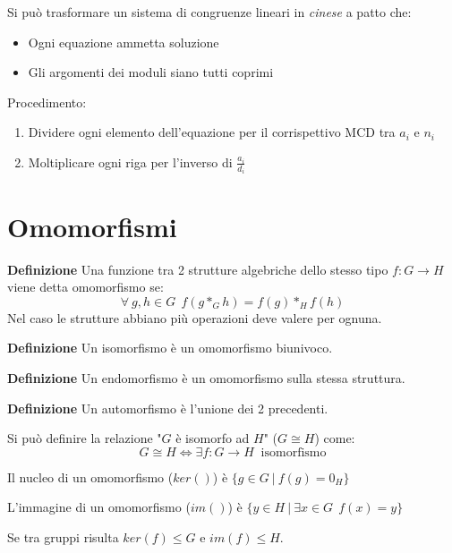 \documentclass{article}
\begin{document}
\noindent Si può trasformare un sistema di congruenze lineari in \textit{cinese} a patto che:
\begin{itemize}
    \item Ogni equazione ammetta soluzione
    \item Gli argomenti dei moduli siano tutti coprimi
\end{itemize}

\noindent Procedimento:
\begin{enumerate}
    \item Dividere ogni elemento dell'equazione per il corrispettivo MCD tra $a_i$ e $n_i$
    \item Moltiplicare ogni riga per l'inverso di $\frac{a_i}{d_i}$
\end{enumerate}

\section{Omomorfismi}

\textbf{Definizione} Una funzione tra 2 strutture algebriche dello stesso tipo $f:G\rightarrow H$ viene detta omomorfismo se:
$$\forall\ g,h\in G\ \ f(g*_Gh)=f(g)*_Hf(h)$$
\noindent Nel caso le strutture abbiano più operazioni deve valere per ognuna.\newline

\noindent\textbf{Definizione} Un isomorfismo è un omomorfismo biunivoco.\newline

\noindent\textbf{Definizione} Un endomorfismo è un omomorfismo sulla stessa struttura.\newline

\noindent\textbf{Definizione} Un automorfismo è l'unione dei 2 precedenti.\newline

\noindent Si può definire la relazione "$G$ è isomorfo ad $H$" ($G\cong H$) come:
$$G\cong H\iff \exists f:G\rightarrow H\ \text{ isomorfismo}$$\newline

\noindent Il nucleo di un omomorfismo ($ker()$) è $\{g\in G\ |\ f(g)=0_H\}$\newline

\noindent L'immagine di un omomorfismo ($im()$) è $\{y\in H\ |\ \exists x\in G\ \ f(x)=y\}$\newline

\noindent Se tra gruppi risulta $ker(f)\leqslant G$ e $im(f)\leqslant H$.\newline
\end{document}
